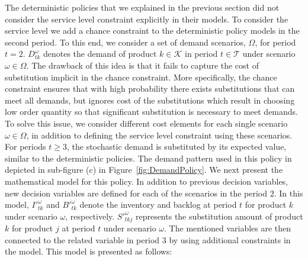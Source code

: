\documentclass[11pt]{article}
\newcommand{\ti}{t} %
\newcommand{\TI}{\mathcal{T}}
\newcommand{\ka}{k} %
\newcommand{\KA}{\mathcal{K}}
\newcommand{\jey}{j} %
\newcommand{\Es}{S} %
\newcommand{\m}{\omega} %
\newcommand{\EM}{\Omega} %
\begin{document}
The deterministic policies that we explained in the previous section did not consider the service level constraint explicitly in their models. To consider the service level we add a chance constraint to the deterministic policy models in the second period. To this end, we consider a set of demand scenarios, $\EM$, for period $\ti =2$. $D^{\m}_{\ti\ka}$ denotes the demand of product $\ka \in \KA$ in period $\ti \in \TI$ under scenario $\m \in \EM$. The drawback of this idea is that it fails to capture the cost of substitution implicit in the chance constraint. More specifically, the chance constraint ensures that with high probability there exists substitutions that
can meet all demands, but ignores cost of the substitutions which result in choosing low order quantity so that significant substitution is necessary
to meet demands. To solve this issue, we consider different cost elements for each single scenario $\m \in \EM$, in addition to defining the service level constraint using these scenarios. 
For periods $\ti \geq 3$, the stochastic demand is substituted by its expected value, similar to the deterministic policies. The demand pattern used in this policy in depicted in sub-figure (c) in Figure~\ref{fig:DemandPolicy}. 
We next present the mathematical model for this policy. In addition to previous decision variables, new decision variables are defined for each of the scenarios in the period $2$. In this model, $I'^{\m}_{\ti \ka }$ and $B'^{\m}_{\ti \ka}$ denote the inventory and backlog at period $\ti$  for product $\ka$ under scenario $\m$, respectively. $\Es'^{\m}_{\ti \ka \jey}$ represents the substitution amount of product $\ka$ for product $\jey$ at period $\ti$ under scenario $\m$. The mentioned variables are then connected to the related variable in period 3 by using additional constraints in the model. This model is presented as follows:
\end{document}
